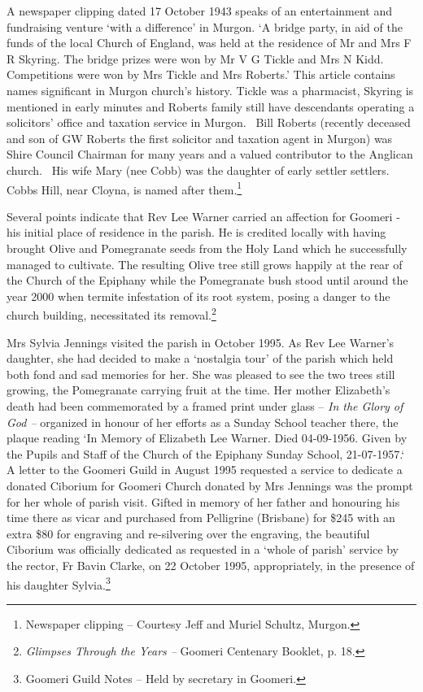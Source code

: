 A newspaper clipping dated 17 October 1943 speaks of an entertainment and fundraising venture `with a difference' in Murgon. `A bridge party, in aid of the funds of the local Church of England, was held at the residence of Mr and Mrs F R Skyring. The bridge prizes were won by Mr V G Tickle and Mrs N Kidd. Competitions were won by Mrs Tickle and Mrs Roberts.' This article contains names significant in Murgon church's history. Tickle was a pharmacist, Skyring is mentioned in early minutes and Roberts family still have descendants operating a solicitors' office and taxation service in Murgon.~ Bill Roberts (recently deceased and son of GW Roberts the first solicitor and taxation agent in Murgon) was Shire Council Chairman for many years and a valued contributor to the Anglican church.~ His wife Mary (nee Cobb) was the daughter of early settler settlers.~ Cobbs Hill, near Cloyna, is named after them.\footnote{Newspaper clipping -- Courtesy Jeff and Muriel Schultz, Murgon.}

Several points indicate that Rev Lee Warner carried an affection for Goomeri - his initial place of residence in the parish. He is credited locally with having brought Olive and Pomegranate seeds from the Holy Land which he successfully managed to cultivate. The resulting Olive tree still grows happily at the rear of the Church of the Epiphany while the Pomegranate bush stood until around the year 2000 when termite infestation of its root system, posing a danger to the church building, necessitated its removal.\footnote{\emph{Glimpses Through the Years --} Goomeri Centenary Booklet, p. 18.}

Mrs Sylvia Jennings visited the parish in October 1995. As Rev Lee Warner's daughter, she had decided to make a `nostalgia tour' of the parish which held both fond and sad memories for her. She was pleased to see the two trees still growing, the Pomegranate carrying fruit at the time. Her mother Elizabeth's death had been commemorated by a framed print under glass -- \emph{In the Glory of God --} organized in honour of her efforts as a Sunday School teacher there, the plaque reading `In Memory of Elizabeth Lee Warner. Died 04-09-1956. Given by the Pupils and Staff of the Church of the Epiphany Sunday School, 21-07-1957.` A letter to the Goomeri Guild in August 1995 requested a service to dedicate a donated Ciborium for Goomeri Church donated by Mrs Jennings was the prompt for her whole of parish visit. Gifted in memory of her father and honouring his time there as vicar and purchased from Pelligrine (Brisbane) for \$245 with an extra \$80 for engraving and re-silvering over the engraving, the beautiful Ciborium was officially dedicated as requested in a `whole of parish' service by the rector, Fr Bavin Clarke, on 22 October 1995, appropriately, in the presence of his daughter Sylvia.\footnote{Goomeri Guild Notes -- Held by secretary in Goomeri.}

